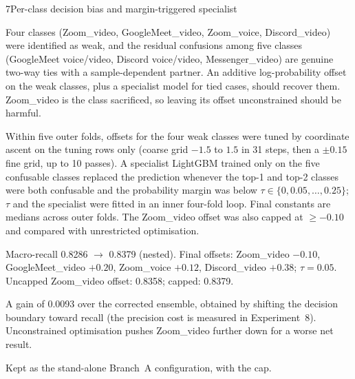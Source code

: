 \begin{explog}{7}{Per-class decision bias and margin-triggered specialist}
\item[Hypothesis] Four classes (Zoom\_video, GoogleMeet\_video, Zoom\_voice, Discord\_video)
were identified as weak, and the residual confusions among five classes
(GoogleMeet voice/video, Discord voice/video, Messenger\_video) are genuine
two-way ties with a sample-dependent partner. An additive log-probability offset
on the weak classes, plus a specialist model for tied cases, should recover them.
Zoom\_video is the class sacrificed, so leaving its offset unconstrained should be
harmful.
\item[Method] Within five outer folds, offsets for the four weak classes were tuned by
coordinate ascent on the tuning rows only (coarse grid $-1.5$ to $1.5$ in 31 steps,
then a $\pm0.15$ fine grid, up to 10 passes). A specialist LightGBM trained only on
the five confusable classes replaced the prediction whenever the top-1 and top-2
classes were both confusable and the probability margin was below
$\tau\in\{0,0.05,\dots,0.25\}$; $\tau$ and the specialist were fitted in an inner
four-fold loop. Final constants are medians across outer folds. The Zoom\_video
offset was also capped at $\geq-0.10$ and compared with unrestricted optimisation.
\item[Result] Macro-recall 0.8286 $\rightarrow$ 0.8379 (nested). Final offsets:
Zoom\_video $-0.10$, GoogleMeet\_video $+0.20$, Zoom\_voice $+0.12$,
Discord\_video $+0.38$; $\tau=0.05$. Uncapped Zoom\_video offset: 0.8358; capped:
0.8379.
\item[Inference] A gain of 0.0093 over the corrected ensemble, obtained by shifting the
decision boundary toward recall (the precision cost is measured in Experiment~8).
Unconstrained optimisation pushes Zoom\_video further down for a worse net result.
\item[Verdict] Kept as the stand-alone Branch~A configuration, with the cap.
\end{explog}

